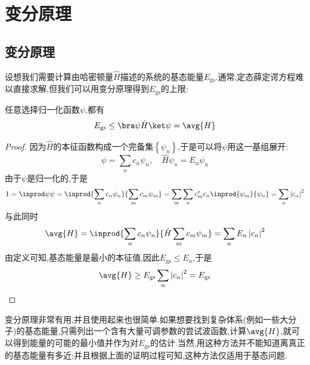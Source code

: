 \documentclass{ctexart}
\begin{document}
\section{变分原理}
\subsection{变分原理}
设想我们需要计算由哈密顿量$\hat{H}$描述的系统的基态能量$E_{\text{gs}}$.通常,定态薛定谔方程难以直接求解,但我们可以用变分原理得到$E_{\text{gs}}$的上限:
\begin{theorem}[变分原理]
    任意选择归一化函数$\psi$,都有
    \[E_{\text{gs}}\leq\bra\psi\hat{H}\ket\psi=\avg{H}\]
\end{theorem}
\begin{proof}
    因为$\hat{H}$的本征函数构成一个完备集$\left\{\psi_n\right\}$,于是可以将$\psi$用这一基组展开:
    \[\psi=\sum_{n}c_n\psi_n,\quad\hat{H}\psi_n=E_n\psi_n\]
    由于$\psi$是归一化的,于是
    \[1=\inprod\psi\psi=\inprod{\sum_{n}c_n\psi_n}{\sum_{m}c_m\psi_m}=\sum_{m}\sum_{n}c_m^\ast c_n\inprod{\psi_m}{\psi_n}=\sum_{n}\left|c_n\right|^2\]
    与此同时
    \[\avg{H}=\inprod{\sum_{n}c_n\psi_n}{\hat{H}\sum_{m}c_m\psi_m}=\sum_{n}E_n\left|c_n\right|^2\]
    由定义可知,基态能量是最小的本征值,因此$E_{\text{gs}}\leq E_n$,于是
    \[\avg{H}\geq E_{\text{gs}}\sum_{n}\left|c_n\right|^2=E_{\text{gs}}\]
\end{proof}
变分原理非常有用,并且使用起来也很简单.如果想要找到复杂体系(例如一些大分子)的基态能量,只需列出一个含有大量可调参数的尝试波函数,计算$\avg{H}$,就可以得到能量的可能的最小值并作为对$E_{\text{gs}}$的估计.当然,用这种方法并不能知道离真正的基态能量有多近;并且根据上面的证明过程可知,这种方法仅适用于基态问题.
\end{document}
